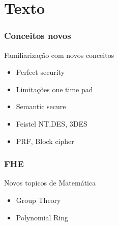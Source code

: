 \section{Texto} %




	


\begin{frame}
	\frametitle{Conceitos novos}
    Familiarização com novos conceitos
    \begin{itemize}
        \item Perfect security
        \item Limitações one time pad
        \item Semantic secure 
        \item Feistel NT,DES, 3DES
        \item PRF, Block cipher 
    \end{itemize}
	
\end{frame}


\begin{frame}
    \frametitle{FHE}
    Novos topicos de Matemática
    \begin{itemize}
        \item Group Theory
        \item Polynomial Ring 
    \end{itemize}
\end{frame}